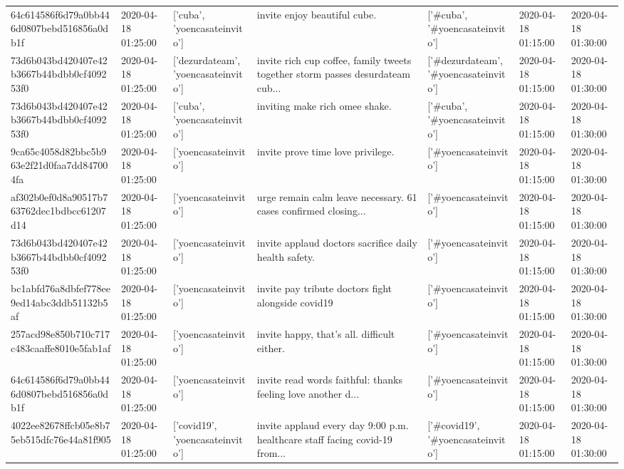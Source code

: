 \begin{tabular}{lllllll}
64c614586f6d79a0bb446d0807bebd516856a0db1f & 2020-04-18 01:25:00 & ['cuba', 'yoencasateinvito'] & invite enjoy beautiful cube. & ['#cuba', '#yoencasateinvito'] & 2020-04-18 01:15:00 & 2020-04-18 01:30:00 \\
73d6b043bd420407e42b3667b44bdbb0cf409253f0 & 2020-04-18 01:25:00 & ['dezurdateam', 'yoencasateinvito'] & invite rich cup coffee, family tweets together storm passes desurdateam cub... & ['#dezurdateam', '#yoencasateinvito'] & 2020-04-18 01:15:00 & 2020-04-18 01:30:00 \\
73d6b043bd420407e42b3667b44bdbb0cf409253f0 & 2020-04-18 01:25:00 & ['cuba', 'yoencasateinvito'] & inviting make rich omee shake. & ['#cuba', '#yoencasateinvito'] & 2020-04-18 01:15:00 & 2020-04-18 01:30:00 \\
9ca65c4058d82bbc5b963e2f21d0faa7dd847004fa & 2020-04-18 01:25:00 & ['yoencasateinvito'] & invite prove time love privilege. & ['#yoencasateinvito'] & 2020-04-18 01:15:00 & 2020-04-18 01:30:00 \\
af302b0ef0d8a90517b763762dec1bdbcc61207d14 & 2020-04-18 01:25:00 & ['yoencasateinvito'] & urge remain calm leave necessary. 61 cases confirmed closing... & ['#yoencasateinvito'] & 2020-04-18 01:15:00 & 2020-04-18 01:30:00 \\
73d6b043bd420407e42b3667b44bdbb0cf409253f0 & 2020-04-18 01:25:00 & ['yoencasateinvito'] & invite applaud doctors sacrifice daily health safety. & ['#yoencasateinvito'] & 2020-04-18 01:15:00 & 2020-04-18 01:30:00 \\
bc1abfd76a8dbfef778ee9ed14abc3ddb51132b5af & 2020-04-18 01:25:00 & ['yoencasateinvito'] & invite pay tribute doctors fight alongside covid19 & ['#yoencasateinvito'] & 2020-04-18 01:15:00 & 2020-04-18 01:30:00 \\
257acd98e850b710c717c483caaffe8010e5fab1af & 2020-04-18 01:25:00 & ['yoencasateinvito'] & invite happy, that's all. difficult either. & ['#yoencasateinvito'] & 2020-04-18 01:15:00 & 2020-04-18 01:30:00 \\
64c614586f6d79a0bb446d0807bebd516856a0db1f & 2020-04-18 01:25:00 & ['yoencasateinvito'] & invite read words faithful: thanks feeling love another d... & ['#yoencasateinvito'] & 2020-04-18 01:15:00 & 2020-04-18 01:30:00 \\
4022ee82678ffcb05e8b75eb515dfc76e44a81f905 & 2020-04-18 01:25:00 & ['covid19', 'yoencasateinvito'] & invite applaud every day 9:00 p.m. healthcare staff facing covid-19 from... & ['#covid19', '#yoencasateinvito'] & 2020-04-18 01:15:00 & 2020-04-18 01:30:00 \\

\end{tabular}
